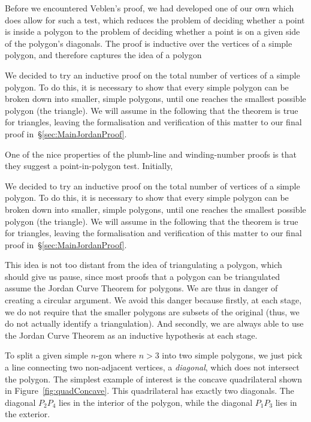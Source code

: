 Before we encountered Veblen's proof, we had developed one of our own which does allow for such a test, which reduces the problem of deciding whether a point is inside a polygon to the problem of deciding whether a point is on a given side of the polygon's diagonals. The proof is inductive over the vertices of a simple polygon, and therefore captures the idea of a polygon 

We decided to try an inductive proof on the total number of vertices of a simple polygon. To do this, it is necessary to show that every simple polygon can be broken down into smaller, simple polygons, until one reaches the smallest possible polygon (the triangle). We will assume in the following that the theorem is true for triangles, leaving the formalisation and verification of this matter to our final proof in~\S\ref{sec:MainJordanProof}.

One of the nice properties of the plumb-line and winding-number proofs is that they suggest a point-in-polygon test. Initially, 

 We decided to try an inductive proof on the total number of vertices of a simple polygon. To do this, it is necessary to show that every simple polygon can be broken down into smaller, simple polygons, until one reaches the smallest possible polygon (the triangle). We will assume in the following that the theorem is true for triangles, leaving the formalisation and verification of this matter to our final proof in~\S\ref{sec:MainJordanProof}.

This idea is not too distant from the idea of triangulating a polygon, which should give us pause, since most proofs that a polygon can be triangulated assume the Jordan Curve Theorem for polygons. We are thus in danger of creating a circular argument. We avoid this danger because firstly, at each stage, we do not require that the smaller polygons are subsets of the original (thus, we do not actually identify a triangulation). And secondly, we are always able to use the Jordan Curve Theorem as an inductive hypothesis at each stage.

To split a given simple $n$-gon where $n>3$ into two simple polygons, we just pick a line connecting two non-adjacent vertices, a \emph{diagonal}, which does not intersect the polygon. The simplest example of interest is the concave quadrilateral shown in Figure~\ref{fig:quadConcave}. This quadrilateral has exactly two diagonals. The diagonal $P_2P_4$ lies in the interior of the polygon, while the diagonal $P_1P_3$ lies in the exterior.

